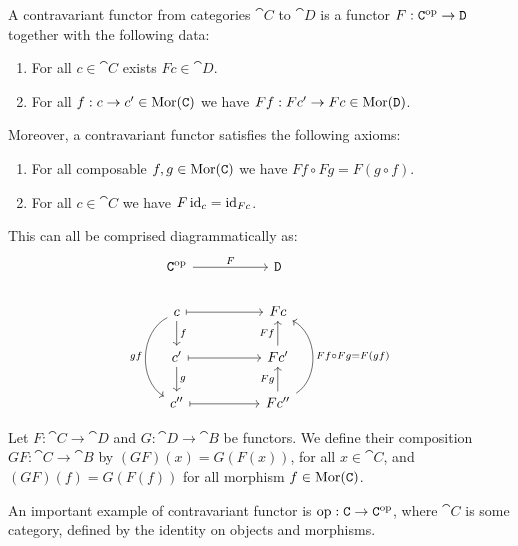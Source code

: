 \begin{definition}
    \label{def: contravariant functor}
    A contravariant functor from categories \(\cat C\) to \(\cat D\) is a functor
    \(F: \texttt C^{\mathrm{op}} \to \texttt D\) together with the following data:
    \begin{enumerate}[({DCF}1)]
        \item For all \(c \in \cat C\) exists \(F c \in \cat D\).
        \item For all \(f: c \to c' \in \operatorname{Mor}(\texttt C)\) we have \(F f: F c' \to F c
              \in \operatorname{Mor}(\texttt D)\).
    \end{enumerate}
    Moreover, a contravariant functor satisfies the following axioms:
    \begin{enumerate}[({ACF}1)]
        \item For all composable \(f, g \in \operatorname{Mor}(\texttt C)\) we have \(F f \circ F g =
              F (g \circ f)\).
        \item For all \(c \in \cat C\) we have \(F \operatorname{id}_c = \operatorname{id}_{F c}\).
    \end{enumerate}
    This can all be comprised diagrammatically as:
    \[
        \begin{tikzcd}
            \cat C^\op \ar[rr, "F"] & &\cat D
            \\
            c \ar[d, "f"] \ar[dd, bend right = 60, swap, "g f"]
            \ar[rr, mapsto]
            & &F c
            \\
            c' \ar[d, "g"] \ar[rr, mapsto]
            & &F c' \ar[u, "F f"]
            \\
            c'' \ar[rr, mapsto]
            & & F c''
            \ar[u, "F g"]
            \ar[uu, bend right = 60, swap, "F f \circ F g = F (gf)"]
        \end{tikzcd}
    \]
\end{definition}

\begin{definition}
    \label{def:composition-functors}
    Let \(F: \cat C \to \cat D\) and \(G: \cat D \to \cat B\) be functors. We define
    their composition \(G F: \cat C \to \cat B\) by \((GF)(x) = G(F(x))\), for all
    \(x \in \cat C\), and \((G F)(f) = G(F(f))\) for all morphism \(f \in \operatorname{Mor}(\texttt
    C)\).
\end{definition}

\begin{example}
    \label{exp:opposite-category}
    An important example of contravariant functor is \(\mathrm{op}: \texttt C \to \texttt
    C^{\mathrm{op}}\), where \(\cat C\) is some category, defined by the identity on objects
    and morphisms.
\end{example}

